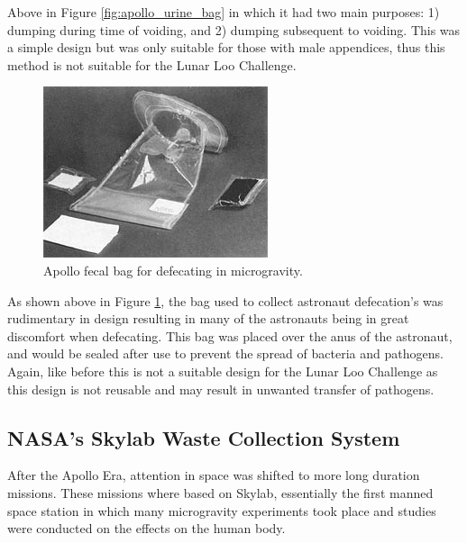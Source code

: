     Above in Figure \ref{fig:apollo_urine_bag} in which it had two main purposes: 1) dumping during time of voiding, and 2) dumping subsequent to voiding. This was a simple design but was only suitable for those with male appendices, thus this method is not suitable for the Lunar Loo Challenge.

    \begin{figure}[h]
        \centering
        \includegraphics[width = 0.6\linewidth]{figs/apollo_fecal_bag.jpg}
        \caption[Apollo Fecal Bag]{Apollo fecal bag for defecating in microgravity.}
        \label{fig:apollo_fecal_bag}
    \end{figure}

    As shown above in Figure \ref{fig:apollo_fecal_bag}, the bag used to collect astronaut defecation's was rudimentary in design resulting in many of the astronauts being in great discomfort when defecating. This bag was placed over the anus of the astronaut, and would be sealed after use to prevent the spread of bacteria and pathogens. Again, like before this is not a suitable design for the Lunar Loo Challenge as this design is not reusable and may result in unwanted transfer of pathogens.
    


    \pagebreak
    \subsection{NASA's Skylab Waste Collection System}
    After the Apollo Era, attention in space was shifted to more long duration missions. These missions where based on Skylab, essentially the first manned space station in which many microgravity experiments took place and studies were conducted on the effects on the human body.

